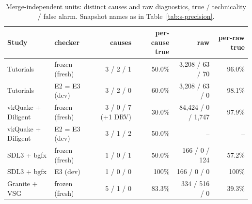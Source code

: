 \documentclass[acmtog,anonymous,review]{acmart}
\begin{document}
\begin{table}[t]
\caption{Merge-independent units: distinct causes and raw diagnostics, true / technicality / false alarm. Snapshot
names as in Table~\ref{tab:s-precision}.}
\label{tab:s-units}
\small
\begin{tabular}{@{}llrrrr@{}}
\toprule
Study & checker & causes & per-cause true & raw & per-raw true \\
\midrule
Tutorials & frozen (fresh) & 3 / 2 / 1 & 50.0\% & 3,208 / 63 / 70 & 96.0\% \\
Tutorials & E2 = E3 (dev) & 3 / 2 / 0 & 60.0\% & 3,208 / 63 / 0 & 98.1\% \\
vkQuake + Diligent & frozen (fresh) & 3 / 0 / 7 (+1 DRV) & 30.0\% & 84,424 / 0 / 1,747 & 97.9\% \\
vkQuake + Diligent & E2 = E3 (dev) & 3 / 1 / 2 & 50.0\% & -- & -- \\
SDL3 + bgfx & frozen (fresh) & 1 / 0 / 1 & 50.0\% & 166 / 0 / 124 & 57.2\% \\
SDL3 + bgfx & E3 (dev) & 1 / 0 / 0 & 100\% & 166 / 0 / 0 & 100\% \\
Granite + VSG & frozen (fresh) & 5 / 1 / 0 & 83.3\% & 334 / 516 / 0 & 39.3\% \\
\bottomrule
\end{tabular}
\end{table}
\end{document}
